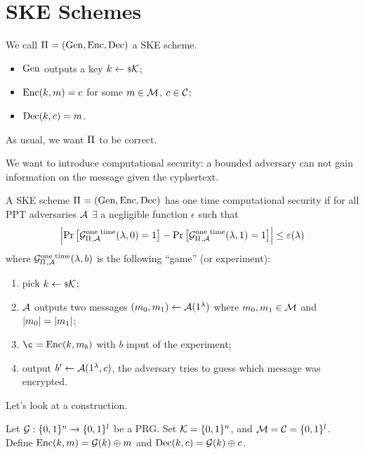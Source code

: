
\section{\acl{SKE} Schemes}

\begin{definition}
	We call $\Pi_{} = \left( \mathrm{Gen} , \allowbreak \mathrm{Enc} , \allowbreak \mathrm{Dec} \right)$ a \ac{SKE} scheme.
	\begin{itemize}
		\item $\mathrm{Gen}$ outputs a key $k \leftarrow {\scriptstyle \$} {\mathcal{K}}$;
		\item $\mathrm{Enc}(k, m) = c$ for some $m \in \mathcal{M}$, $c \in \mathcal{C}$;
		\item $\mathrm{Dec}(k, c) = m$.
	\end{itemize}
	As usual, we want $\Pi_{}$ to be correct.
\end{definition}

We want to introduce computational security: a bounded adversary can not gain information on the message given the cyphertext.
\begin{definition}
	A \ac{SKE} scheme $\Pi_{} = \left( \mathrm{Gen} , \allowbreak \mathrm{Enc} , \allowbreak \mathrm{Dec} \right)$ has one time computational security if for all \ac{PPT} adversaries $\mathcal{A}$ $\exists$ a negligible function $\epsilon$ such that
	\begin{equation*}
		\left|{
			\mathop{\mathrm{Pr}}\limits_{} \left[ {\mathcal{G}^{\scriptstyle \text{one time}}_{\Pi_{}, \mathcal{A}}(\lambda, 0) = 1} \right]
			-
			\mathop{\mathrm{Pr}}\limits_{} \left[ {\mathcal{G}^{\scriptstyle \text{one time}}_{\Pi_{}, \mathcal{A}}(\lambda, 1) = 1} \right]
		}\right|
		\le \varepsilon(\lambda)
	\end{equation*}
	where $\mathcal{G}^{\scriptstyle \text{one time}}_{\Pi_{}, \mathcal{A}}(\lambda, b)$ is the following ``game'' (or experiment):
	\begin{enumerate}
		\item pick $k \leftarrow {\scriptstyle \$} {\mathcal{K}}$;
		\item $\mathcal{A}$ outputs two messages $(m_0, m_1) \leftarrow \mathcal{A}(1^{\lambda})$ where $m_0, m_1 \in \mathcal{M}$ and $\left|{m_0}\right| = \left|{m_1}\right|$;
		\item $\c = \SKEEnc(k, m_b)$ with $b$ input of the experiment;
		\item output $b' \leftarrow \mathcal{A}(1^{\lambda}, c)$, \ie the adversary tries to guess which message was encrypted. \qedhere
	\end{enumerate}
\end{definition}

Let's look at a construction.
\begin{construction} \label{cons:ske-prg}
	Let $\mathcal{G} : \{0,1\}^{n} \to \{0,1\}^{l}$ be a \ac{PRG}.
	Set $\mathcal{K} = \{0,1\}^{n}$, and $\mathcal{M} = \mathcal{C} = \{0,1\}^{l}$.
	Define $\mathrm{Enc}(k,m) = \mathcal{G}(k) \oplus m$ and $\mathrm{Dec}(k,c) = \mathcal{G}(k) \oplus c$.
\end{construction}

